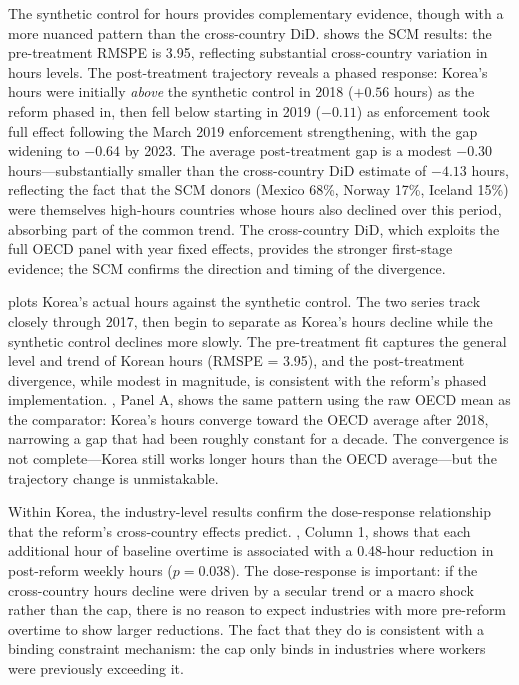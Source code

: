 \documentclass[12pt]{article}
\begin{document}
The synthetic control for hours provides complementary evidence, though with a more nuanced pattern than the cross-country DiD.  shows the SCM results: the pre-treatment RMSPE is 3.95, reflecting substantial cross-country variation in hours levels. The post-treatment trajectory reveals a phased response: Korea's hours were initially \textit{above} the synthetic control in 2018 ($+0.56$ hours) as the reform phased in, then fell below starting in 2019 ($-0.11$) as enforcement took full effect following the March 2019 enforcement strengthening, with the gap widening to $-0.64$ by 2023. The average post-treatment gap is a modest $-0.30$ hours---substantially smaller than the cross-country DiD estimate of $-4.13$ hours, reflecting the fact that the SCM donors (Mexico 68\%, Norway 17\%, Iceland 15\%) were themselves high-hours countries whose hours also declined over this period, absorbing part of the common trend. The cross-country DiD, which exploits the full OECD panel with year fixed effects, provides the stronger first-stage evidence; the SCM confirms the direction and timing of the divergence.

 plots Korea's actual hours against the synthetic control. The two series track closely through 2017, then begin to separate as Korea's hours decline while the synthetic control declines more slowly. The pre-treatment fit captures the general level and trend of Korean hours (RMSPE = 3.95), and the post-treatment divergence, while modest in magnitude, is consistent with the reform's phased implementation. , Panel A, shows the same pattern using the raw OECD mean as the comparator: Korea's hours converge toward the OECD average after 2018, narrowing a gap that had been roughly constant for a decade. The convergence is not complete---Korea still works longer hours than the OECD average---but the trajectory change is unmistakable.

Within Korea, the industry-level results confirm the dose-response relationship that the reform's cross-country effects predict. , Column 1, shows that each additional hour of baseline overtime is associated with a 0.48-hour reduction in post-reform weekly hours ($p = 0.038$). The dose-response is important: if the cross-country hours decline were driven by a secular trend or a macro shock rather than the cap, there is no reason to expect industries with more pre-reform overtime to show larger reductions. The fact that they do is consistent with a binding constraint mechanism: the cap only binds in industries where workers were previously exceeding it.
\end{document}
